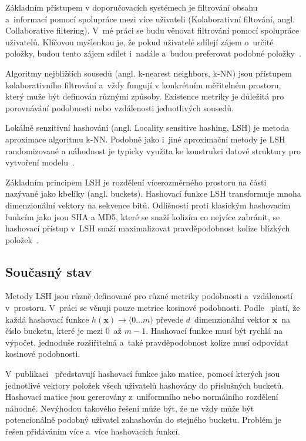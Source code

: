 \documentclass[11pt]{article}
\begin{document}
Základním přístupem v doporučovacích systémech je filtrování obsahu a~informací pomocí spolupráce mezi více uživateli (Kolaborativní filtování, angl. Collaborative filtering). V~mé práci se budu věnovat filtrování pomocí spolupráce uživatelů. Klíčovou myšlenkou je, že pokud uživatelé sdílejí zájem o~určité položky, budou tento zájem sdílet i~nadále a~budou preferovat podobné položky~\cite{xue2005scalable}.

Algoritmy nejbližších sousedů (angl. k-nearest neighbors, k-NN) jsou přístupem kolaborativního filtrování a~vždy fungují v konkrétním měřitelném prostoru, který muže být definován různými způsoby. Existence metriky je důležitá pro porovnávání podobnosti nebo vzdálenosti jednotlivých sousedů.

Lokálně senzitivní hashování (angl. Locality sensitive hashing, LSH) je metoda aproximace algoritmu k-NN. Podobně jako i~jiné aproximační metody je LSH randomizované a náhodnost je typicky využita ke konstrukci datové struktury pro vytvoření modelu~\cite{shakhnarovich2006nearest}.

Základním principem LSH je rozdělení vícerozměrného prostoru na části nazývané
jako kbelíky (angl. buckets). Hashovací funkce LSH transformuje mnoha dimenzionální vektory na sekvence bitů. Odlišností proti klasickým hashovacím funkcím jako jsou SHA a MD5, které se snaží kolizím co nejvíce zabránit, se hashovací přístup v~LSH snaží maximalizovat pravděpodobnost kolize blízkých položek~\cite{wang2014hashing}.
\subsection{Současný stav}
Metody LSH jsou různě definované pro různé metriky podobnosti a~vzdáleností v~prostoru. V~práci se věnuji pouze metrice kosinové podobnosti. Podle~\cite{argerich2017generic} platí, že každá hashovací funkce $h(\mathbf{x}) \to \langle0 \dots m ) $ převede $d$~dimenzionální vektor $\mathbf{x}$~na číslo bucketu, které je mezi $0$~až $m-1$. Hashovací funkce musí být rychlá na výpočet, jednoduše rozšiřitelná a~také pravděpodobnost kolize musí odpovídat kosinové podobnosti.

V~publikaci~\cite{argerich2017generic} představují hashovací funkce jako matice, pomocí kterých jsou jednotlivé vektory položek všech uživatelů hashovány do příslušných bucketů. Hashovací matice jsou gererovány z~uniformního nebo normálního rozdělení náhodně. Nevýhodou takového řešení může být, že ne vždy může být potencionálně podobný uživatel zahashován do stejného bucketu. Problém je řešen přidáváním více a~více hashovacích funkcí. 
\end{document}

